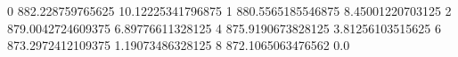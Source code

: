 0 882.228759765625 10.12225341796875
1 880.5565185546875 8.45001220703125
2 879.0042724609375 6.89776611328125
4 875.9190673828125 3.81256103515625
6 873.2972412109375 1.19073486328125
8 872.1065063476562 0.0

